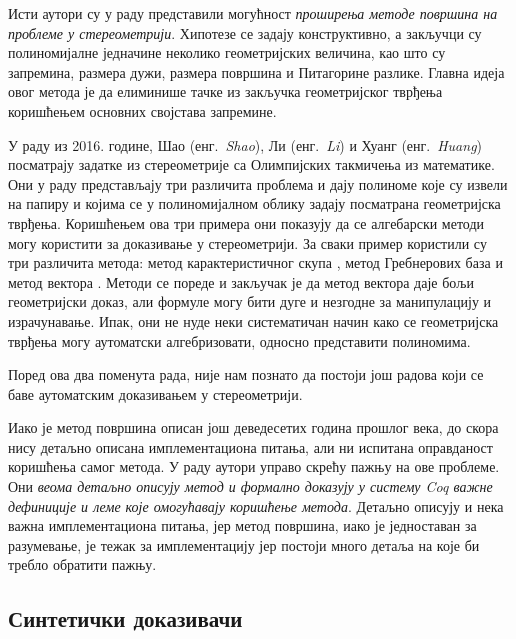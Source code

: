 Исти аутори су у раду \cite{chou1995volume} представили могућност
\emph{проширења методе површина на проблеме у стереометрији}. Хипотезе
се задају конструктивно, а закључци су полиномијалне једначине
неколико геометријских величина, као што су запремина, размера дужи,
размера површина и Питагорине разлике. Главна идеја овог метода је да
елиминише тачке из закључка геометријског тврђења коришћењем основних
својстава запремине.

У раду из 2016. године, Шао (енг.~\emph{Shao}), Ли (енг.~\emph{Li}) и
Хуанг (енг.~\emph{Huang}) \cite{shao2016challenging} посматрају
задатке из стереометрије са Олимпијских такмичења из математике. Они у
раду представљају три различита проблема и дају полиноме које су
извели на папиру и којима се у полиномијалном облику задају посматрана
геометријска тврђења. Коришћењем ова три примера они показују да се
алгебарски методи могу користити за доказивање у стереометрији. За
сваки пример користили су три различита метода: метод карактеристичног
скупа \cite{wu2007mathematics, wang1998decomposing,
  gao1991computations, chen2002projection}, метод Гребнерових база
\cite{cox1992ideals, kutzler1986application, stifter1993geometry,
  chou1987characteristic} и метод вектора
\cite{lord1985method}. Методи се пореде и закључак је да метод вектора
даје бољи геометријски доказ, али формуле могу бити дуге и незгодне за
манипулацију и израчунавање. Ипак, они не нуде неки систематичан начин
како се геометријска тврђења могу аутоматски алгебризовати, односно
представити полиномима.

Поред ова два поменута рада, није нам познато да постоји још радова
који се баве аутоматским доказивањем у стереометрији.

Иако је метод површина описан још деведесетих година прошлог века, до
скора нису детаљно описана имплементациона питања, али ни испитана
оправданост коришћења самог метода. У раду \cite{janivcic2012area}
аутори управо скрећу пажњу на ове проблеме. Они \emph{веома детаљно
  описују метод и формално доказују у систему Coq важне дефиниције и
  леме које омогућавају коришћење метода}. Детаљно описују и нека
важна имплементациона питања, јер метод површина, иако је једноставан
за разумевање, је тежак за имплементацију јер постоји много детаља на
које би требло обратити пажњу.

\subsection{Синтетички доказивачи}

